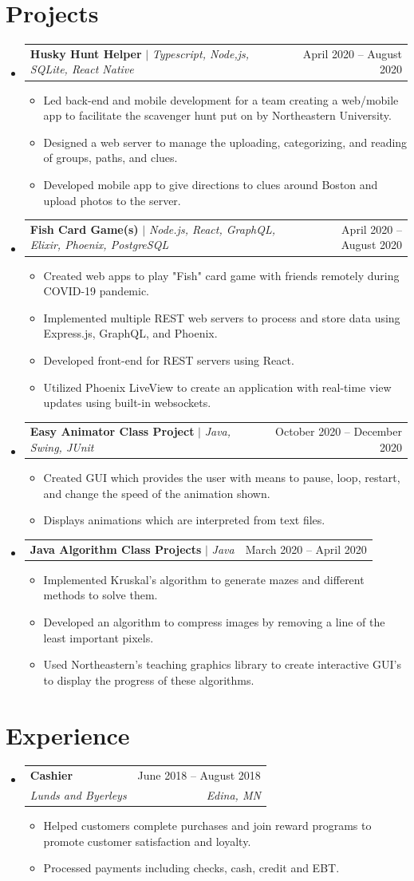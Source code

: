 \documentclass[letterpaper,11pt]{article}
\makeatletter
\newcommand{\resumeItem}[1]{
	\item\small{
		{#1 \vspace{-2pt}}
	}
}
\newcommand{\resumeSubheading}[4]{
	\vspace{-2pt}\item
	\begin{tabular*}{0.97\textwidth}[t]{l@{\extracolsep{\fill}}r}
		\textbf{#1} & #2 \\
		\textit{\small#3} & \textit{\small #4} \\
	\end{tabular*}\vspace{-7pt}
}
\newcommand{\resumeProjectHeading}[2]{
	\item
	\begin{tabular*}{0.97\textwidth}{l@{\extracolsep{\fill}}r}
		\small#1 & #2 \\
	\end{tabular*}\vspace{-7pt}
}
\newcommand{\resumeSubHeadingListStart}{\begin{itemize}[leftmargin=0.15in, label={}]}
\newcommand{\resumeSubHeadingListEnd}{\end{itemize}}
\newcommand{\resumeItemListStart}{\begin{itemize}}
\newcommand{\resumeItemListEnd}{\end{itemize}\vspace{-5pt}}
\makeatother
\begin{document}
\section{Projects}
\resumeSubHeadingListStart
\resumeProjectHeading
{\textbf{Husky Hunt Helper} $|$ \emph{Typescript, Node,js, SQLite, React Native}}{April 2020 -- August 2020}
\resumeItemListStart
\resumeItem{Led back-end and mobile development for a team creating a web/mobile app to facilitate the scavenger hunt put on by Northeastern University.}
\resumeItem{Designed a web server to manage the uploading, categorizing, and reading of groups, paths, and clues.}
\resumeItem{Developed mobile app to give directions to clues around Boston and upload photos to the server.}
\resumeItemListEnd
\resumeProjectHeading
{\textbf{Fish Card Game(s)} $|$ \emph{Node.js, React, GraphQL, Elixir, Phoenix, PostgreSQL}}{April 2020 -- August 2020}
\resumeItemListStart
\resumeItem{Created web apps to play "Fish" card game with friends remotely during COVID-19 pandemic.}
\resumeItem{Implemented multiple REST web servers to process and store data using Express.js, GraphQL, and Phoenix.}
\resumeItem{Developed front-end for REST servers using React.}
\resumeItem{Utilized Phoenix LiveView to create an application with real-time view updates using built-in websockets.}
\resumeItemListEnd
\resumeProjectHeading
{\textbf{Easy Animator Class Project} $|$
	\emph{Java, Swing, JUnit}}{October 2020 -- December 2020}
\resumeItemListStart
\resumeItem{Created GUI which provides the user with means to pause, loop, restart, and change the speed of the animation shown.}
\resumeItem{Displays animations which are interpreted from text files.}
\resumeItemListEnd
\resumeProjectHeading
{\textbf{Java Algorithm Class Projects} $|$
	\emph{Java}}{March 2020 -- April 2020}
\resumeItemListStart
\resumeItem{Implemented Kruskal's algorithm to generate mazes and different methods to solve them.}
\resumeItem{Developed an algorithm to compress images by removing a line of the least important pixels.}
\resumeItem{Used Northeastern's teaching graphics library to create interactive GUI's to display the progress of these algorithms.}
\resumeItemListEnd
\resumeSubHeadingListEnd

\section{Experience}
\resumeSubHeadingListStart
\resumeSubheading
{Cashier}{June 2018 -- August 2018}
{Lunds and Byerleys}{Edina, MN}
\resumeItemListStart
\resumeItem{Helped customers complete purchases and join reward programs to promote customer satisfaction and loyalty.}
\resumeItem{Processed payments including checks, cash, credit and EBT.}
\resumeItemListEnd
\resumeSubHeadingListEnd
\end{document}
